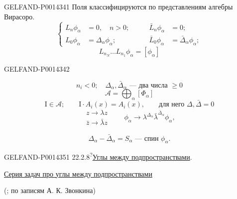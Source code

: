 \begin{GelfandAdjacentEvidence}{GELFAND-P001434}{1}
Поля классифицируются по представлениям алгебры Вирасоро.
\begin{equation*}
\tag{26}
\left\{
\begin{aligned}
L_n\phi_\alpha&=0,\quad n>0;&\qquad \bar L_n\phi_\alpha&=0;\\
L_0\phi_\alpha&=\Delta_\alpha\phi_\alpha;&\qquad
\bar L_0\phi_\alpha&=\bar\Delta_\alpha\phi_\alpha;
\end{aligned}
\right.
\end{equation*}
\[
L_{n_N}\ldots L_{n_1}\phi_\alpha=[\phi_\alpha]
\]
\end{GelfandAdjacentEvidence}
\begin{GelfandAdjacentEvidence}{GELFAND-P001434}{2}

\[
n_i<0;\quad\Delta_\alpha,\bar\Delta_\alpha\text{ — два числа }\geq0
\]
\[
\mathcal A=\bigoplus_\alpha[\Phi_\alpha]
\]
\[
\mathrm I\in\mathcal A;\qquad\mathrm I\cdot A_i(x)=A_i(x),\qquad
\text{для него }\Delta,\bar\Delta=0
\]
\[
\begin{gathered}
z\to\lambda z\\
\bar z\to\bar\lambda z
\end{gathered}
\qquad \phi_\alpha\to\lambda^{\Delta_\alpha}\bar\lambda^{\bar\Delta_\alpha}\phi_\alpha,
\]
\end{GelfandAdjacentEvidence}

\[
\Delta_\alpha-\bar\Delta_\alpha=S_\alpha\text{ — спин }\phi_\alpha.
\]


\begin{GelfandAdjacentEvidence}{GELFAND-P001435}{1}
22.2.8\textsuperscript{?}\quad \uline{Углы между подпространствами}.
\end{GelfandAdjacentEvidence}


\begin{center}
\uline{Серия задач про углы между подпространствами}

(; по записям А. К. Звонкина)
\end{center}

